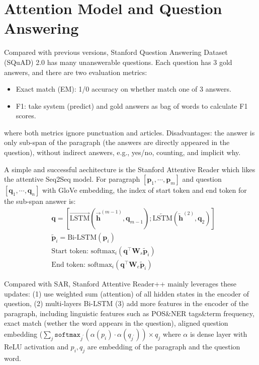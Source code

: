 \section{Attention Model and Question Answering}

Compared with previous versions, Stanford Question Answering Dataset (SQuAD) 2.0 has many unanswerable questions.
Each question has 3 gold answers, and there are two evaluation metrics:
\begin{itemize}
	\item Exact match (EM): 1/0 accuracy on whether match one of 3 answers.
	\item F1: take system (predict) and gold answers as bag of words to calculate F1 scores.
\end{itemize}
where both metrics ignore punctuation and articles.
Disadvantages:  the answer is only sub-span of the paragraph (the answers are directly appeared in the question), without indirect answers, e.g., yes/no, counting, and implicit why.

A simple and successful aechitecture is the Stanford Attentive Reader  which likes the attentive Seq2Seq model.
For paragraph $[\bm{p}_1, \cdots, \bm{p}_m]$ and question $[\bm{q}_1, \cdots, \bm{q}_n]$ with GloVe embedding, the index of start token and end token for the sub-span answer is:
\begin{align}
&\bm{q} = [\overrightarrow{\text{LSTM}}(\overrightarrow{\bm{h}}^{(m-1)}, \bm{q}_{m-1}); \overleftarrow{\text{LSTM}}(\overleftarrow{\bm{h}}^{(2)}, \bm{q}_{2})] \nonumber \\
&\tilde{\bm{p}}_i = \text{Bi-LSTM}(\bm{p}_i) \nonumber \\
&\text{Start token: } \text{softmax}_i (\bm{q}^\top \bm{W}_s \tilde{\bm{p}}_i) \nonumber \\
&\text{End token: } \text{softmax}_i (\bm{q}^\top \bm{W}_e \tilde{\bm{p}}_i) \nonumber
\end{align}

Compared with SAR, Stanford Attentive Reader++  mainly leverages these updates: (1) use weighted sum (attention) of all hidden states in the encoder of question, (2) multi-layers Bi-LSTM (3) add more features in the encoder of the paragraph, including linguistic features such as POS\&NER tags\&term frequency, exact match (wether the word appears in the question), aligned question embedding ($\sum_j \texttt{softmax}_{j^\prime}(\alpha(p_i) \cdot \alpha(q_{j^\prime})) \times q_j$ where $\alpha$ is dense layer with ReLU activation and $p_i, q_j$ are embedding of the paragraph and the question word.

